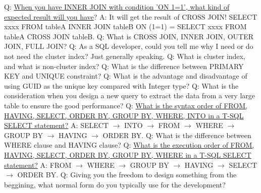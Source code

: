 \documentclass[a4paper,11pt]{article}
\begin{document}
\noindent 
Q: \ul{When you have INNER JOIN with condition 'ON 1=1', what kind of expected result will you have}? \newline 
A: It will get the result of CROSS JOIN! SELECT xxxx FROM tableA INNER JOIN tableB ON (1=1) = SELECT xxxx FROM tableA CROSS JOIN tableB. \newline \newline
\noindent 
Q: What is CROSS JOIN, INNER JOIN, OUTER JOIN, FULL JOIN? \newline \newline
\noindent 
Q: As a SQL developer, could you tell me why I need or do not need the cluster index? Just generally speaking.\newline \newline
\noindent 
Q: What is cluster index, and what is non-cluster index?\newline \newline
\noindent 
Q: What is the difference between PRIMARY KEY and UNIQUE constraint?\newline \newline
\noindent 
Q: What is the advantage and disadvantage of using GUID as the unique key compared with Integer type? \newline \newline
\noindent 
Q: What is the consideration when you design a new query to extract the data from a very large table to ensure the good performance? \newline \newline
\noindent 
Q: \ul{What is the syntax order of FROM, HAVING, SELECT, ORDER BY, GROUP BY, WHERE, INTO in a T-SQL SELECT statement?} \newline
A: SELECT $\rightarrow$ INTO $\rightarrow$ FROM $\rightarrow$ WHERE $\rightarrow$ GROUP BY $\rightarrow$ HAVING $\rightarrow$ ORDER BY. \newline \newline
\noindent 
Q: What is the difference between WHERE clause and HAVING clause? \newline \newline
\noindent 
Q: \ul{What is the execution order of FROM, HAVING, SELECT, ORDER BY, GROUP BY, WHERE in a T-SQL SELECT statement?} \newline
A: FROM $\rightarrow$ WHERE $\rightarrow$ GROUP BY $\rightarrow$ HAVING $\rightarrow$ SELECT $\rightarrow$ ORDER BY. \newline \newline
\noindent 
Q: Giving you the freedom to design something from the beggining, what normal form do you typically use for the development? \newline \newline
\end{document}
